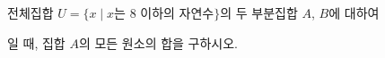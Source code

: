 전체집합 $U=\{x \mid x$는 $8$ 이하의 자연수$\}$의 두 부분집합 $A$, $B$에 대하여 \par\smallskip{}\par\smallskip\noindent 일 때, 집합 $A$의 모든 원소의 합을 구하시오.
